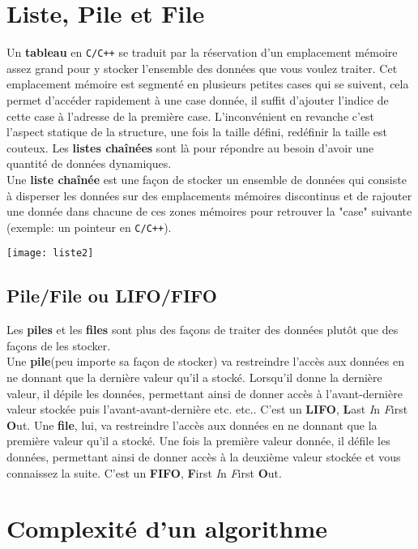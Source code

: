 \documentclass[11pt]{extarticle}
\begin{document}
\section{Liste, Pile et File}
Un \textbf{tableau} en \verb!C/C++! se traduit par la réservation d'un emplacement mémoire assez grand pour y stocker l'ensemble des données que vous voulez traiter. Cet emplacement mémoire est segmenté en plusieurs petites cases qui se suivent, cela permet d'accéder rapidement à une case donnée, il suffit d'ajouter l'indice de cette case à l'adresse de la première case. L'inconvénient en revanche c'est l'aspect statique de la structure, une fois la taille défini, redéfinir la taille est couteux. Les \textbf{listes chaînées} sont là pour répondre au besoin d'avoir une quantité de données dynamiques.\\
Une \textbf{liste chaînée} est une façon de stocker un ensemble de données qui consiste à disperser les données sur des emplacements mémoires discontinus et de rajouter une donnée dans chacune de ces zones mémoires pour retrouver la "case" suivante (exemple: un pointeur en \verb!C/C++!).
\begin{center}
\texttt{[image: liste2]}
\end{center}
\subsection{Pile/File ou LIFO/FIFO}
Les \textbf{piles} et les \textbf{files} sont plus des façons de traiter des données plutôt que des façons de les stocker. \\
Une \textbf{pile}(peu importe sa façon de stocker) va restreindre l'accès aux données en ne donnant que la dernière valeur qu'il a stocké. Lorsqu'il donne la dernière valeur, il dépile les données, permettant ainsi de donner accès à l'avant-dernière valeur stockée puis l'avant-avant-dernière etc. etc.. C'est un \textbf{LIFO}, \textbf{L}ast \textit{I}n \textit{F}irst \textbf{O}ut.
Une \textbf{file}, lui, va restreindre l'accès aux données en ne donnant que la première valeur qu'il a stocké. Une fois la première valeur donnée, il défile les données, permettant ainsi de donner accès à la deuxième valeur stockée et vous connaissez la suite. C'est un \textbf{FIFO}, \textbf{F}irst \textit{I}n \textit{F}irst \textbf{O}ut.
\newpage
\section{Complexité d'un algorithme}
\end{document}
